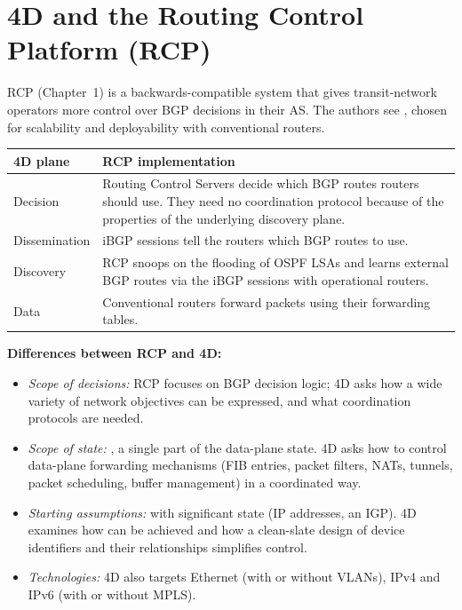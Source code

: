 \section{4D and the Routing Control Platform (RCP)}
RCP (Chapter~1) is a backwards-compatible system that gives transit-network operators more control over BGP decisions in their AS. The authors see , chosen for scalability and deployability with conventional routers.
\begin{center}
\begin{tabularx}{0.9\linewidth}{@{}l X@{}}
\toprule
\textbf{4D plane} & \textbf{RCP implementation} \\
\midrule
Decision & Routing Control Servers decide which BGP routes routers should use. They need no coordination protocol because of the properties of the underlying discovery plane. \\
Dissemination & iBGP sessions tell the routers which BGP routes to use. \\
Discovery & RCP snoops on the flooding of OSPF LSAs and learns external BGP routes via the iBGP sessions with operational routers. \\
Data & Conventional routers forward packets using their forwarding tables. \\
\bottomrule
\end{tabularx}
\end{center}

\textbf{Differences between RCP and 4D:}
\begin{itemize}
\item \emph{Scope of decisions:} RCP focuses on BGP decision logic; 4D asks how a wide variety of network objectives can be expressed, and what coordination protocols are needed.
\item \emph{Scope of state:} , a single part of the data-plane state. 4D asks how to control  data-plane forwarding mechanisms (FIB entries, packet filters, NATs, tunnels, packet scheduling, buffer management) in a coordinated way.
\item \emph{Starting assumptions:}  with significant state (IP addresses, an IGP). 4D examines how  can be achieved and how a clean-slate design of device identifiers and their relationships simplifies control.
\item \emph{Technologies:} 4D also targets Ethernet (with or without VLANs), IPv4 and IPv6 (with or without MPLS).
\end{itemize}

